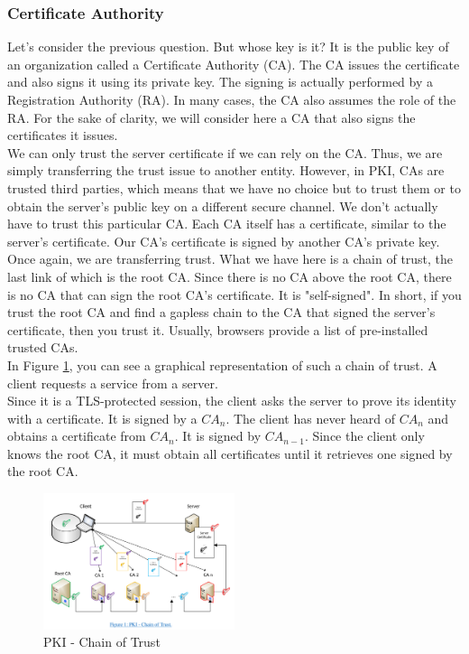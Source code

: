 \subsubsection{Certiﬁcate Authority}\cite{b38}
Let's consider the previous question. But whose key is it? It is the public key of an 
organization called a Certificate Authority (CA). The CA issues the certificate and 
also signs it using its private key. The signing is actually performed by a 
Registration Authority (RA). In many cases, the CA also assumes the role of the RA. 
For the sake of clarity, we will consider here a CA that also signs the certificates 
it issues.
\\
We can only trust the server certificate if we can rely on the CA. Thus, we are 
simply transferring the trust issue to another entity. However, in PKI, CAs are 
trusted third parties, which means that we have no choice but to trust them or to 
obtain the server's public key on a different secure channel. We don't actually have 
to trust this particular CA. Each CA itself has a certificate, similar to the server's 
certificate. Our CA's certificate is signed by another CA's private key. Once again, 
we are transferring trust. What we have here is a chain of trust, the last link of which 
is the root CA. Since there is no CA above the root CA, there is no CA that can sign 
the root CA's certificate. It is "self-signed". In short, if you trust the root CA and 
find a gapless chain to the CA that signed the server's certificate, then you trust it. 
Usually, browsers provide a list of pre-installed trusted CAs.
\\
In Figure \ref{Fig.2: PKI_Chain_of_Trust}, you can see a graphical representation of 
such a chain of trust. A client requests a service from a server.
\\
Since it is a TLS-protected session, the client asks the server to prove its identity 
with a certificate. It is signed by a $CA_n$. The client has never heard of $CA_n$ and obtains 
a certificate from $CA_n$. It is signed by $CA_{n-1}$. Since the client only knows the root CA, 
it must obtain all certificates until it retrieves one signed by the root CA.

\begin{figure}[H] %
    \centering %
    \includegraphics[width=0.5\textwidth]{figures/PKI_Chain_of_Trust.png} %
    \caption{PKI - Chain of Trust} %
    \label{Fig.2: PKI_Chain_of_Trust} %
    \end{figure}

